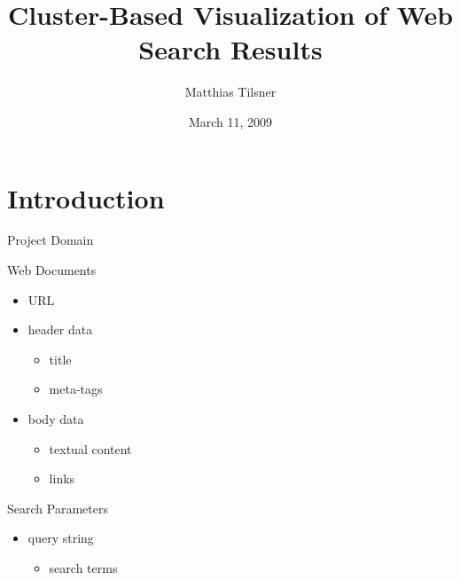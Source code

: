 \documentclass{beamer}
\title{Cluster-Based Visualization of Web Search Results}
\author{Matthias Tilsner}
\date{March 11, 2009}
\begin{document}
\frame{\titlepage}

\frame{\tableofcontents}

\section{Introduction}
\begin{frame}{Project Domain}
	\begin{beamerboxesrounded}[shadow=true]{Web Documents}
		\begin{itemize}
			\item URL
			\item header data \begin{itemize}
				\item title
				\item meta-tags
			\end{itemize}
			\item body data \begin{itemize}
				\item textual content
				\item links
			\end{itemize}
		\end{itemize}
	\end{beamerboxesrounded}
	\vspace{5mm} \pause
	\begin{beamerboxesrounded}[shadow=true]{Search Parameters}
		\begin{itemize}
			\item query string \begin{itemize}
				\item search terms
			\end{itemize}
		\end{itemize}
	\end{beamerboxesrounded}
\end{frame}
\end{document}
